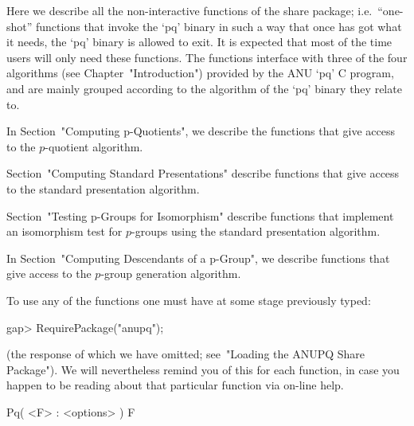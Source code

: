 

Here we describe all the non-interactive functions of the {\ANUPQ}  share
package; i.e.~``one-shot'' functions that invoke the `pq' binary in  such
a way that once {\GAP} has got what it needs, the `pq' binary is  allowed
to exit. It is expected that most of the time users will only need  these
functions. The functions interface with three of the four algorithms (see
Chapter~"Introduction") provided by the  ANU  `pq'  C  program,  and  are
mainly grouped according to the algorithm of the `pq' binary they  relate
to.

In Section~"Computing p-Quotients", we describe the functions  that  give
access to the $p$-quotient algorithm.

Section~"Computing Standard Presentations" describe functions  that  give
access to the standard presentation algorithm.

Section~"Testing  p-Groups  for  Isomorphism"  describe  functions   that
implement  an  isomorphism  test  for  $p$-groups  using   the   standard
presentation algorithm.

In Section~"Computing Descendants of a p-Group",  we  describe  functions
that give access to the $p$-group generation algorithm.

To use any of the functions one must have at some stage previously typed:

\beginexample
gap> RequirePackage("anupq");
\endexample

(the response of which we have  omitted;  see~"Loading  the  ANUPQ  Share
Package"). We will nevertheless remind you of this for each function,  in
case you happen to be reading about that particular function via  on-line
help.


\>Pq( <F> : <options> ) F


